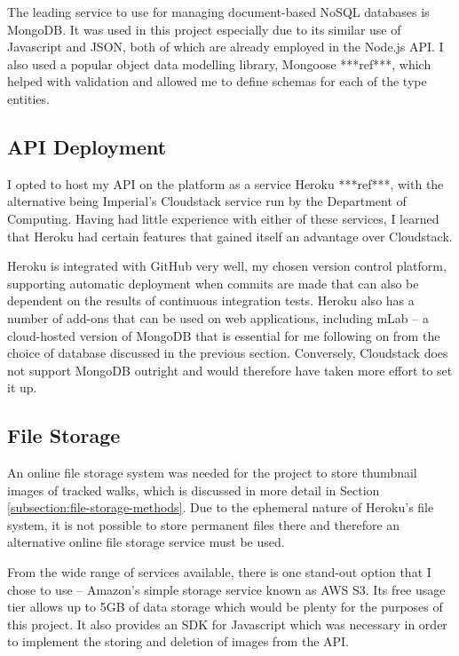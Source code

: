 The leading service to use for managing document-based NoSQL databases is MongoDB. It was used in this project especially due to its similar use of Javascript and JSON, both of which are already employed in the Node.js API. I also used a popular object data modelling library, Mongoose ***ref***, which helped with validation and allowed me to define schemas for each of the type entities.

\subsection{API Deployment}

I opted to host my API on the platform as a service Heroku ***ref***, with the alternative being Imperial's Cloudstack service run by the Department of Computing. Having had little experience with either of these services, I learned that Heroku had certain features that gained itself an advantage over Cloudstack.

Heroku is integrated with GitHub very well, my chosen version control platform, supporting automatic deployment when commits are made that can also be dependent on the results of continuous integration tests. Heroku also has a number of add-ons that can be used on web applications, including mLab -- a cloud-hosted version of MongoDB that is essential for me following on from the choice of database discussed in the previous section. Conversely, Cloudstack does not support MongoDB outright and would therefore have taken more effort to set it up.

\subsection{File Storage}

An online file storage system was needed for the project to store thumbnail images of tracked walks, which is discussed in more detail in Section \ref{subsection:file-storage-methods}. Due to the ephemeral nature of Heroku's file system, it is not possible to store permanent files there and therefore an alternative online file storage service must be used.

From the wide range of services available, there is one stand-out option that I chose to use -- Amazon's simple storage service known as AWS S3. Its free usage tier allows up to 5GB of data storage which would be plenty for the purposes of this project. It also provides an SDK for Javascript which was necessary in order to implement the storing and deletion of images from the API.


